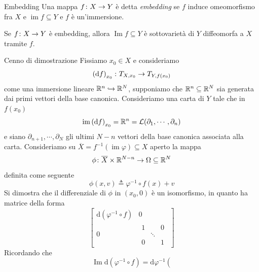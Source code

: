 \documentclass[a4paper]{article}
\begin{document}
\begin{snippetdefinition}{Embedding}
    Una mappa \(f \colon X \to Y\) è detta
    \emph{embedding} se \(f\) induce omeomorfismo fra \(X\)
    e \(\operatorname{im} f \subseteq Y\) e \(f\) è un'immersione.
\end{snippetdefinition}

\begin{snippetproposition}{}
    Se \(f \colon X \to Y\) è embedding, allora
    \(\operatorname{Im}f  \subseteq Y\) è sottovarietà
    di \(Y\) diffeomorfa a \(X\) tramite \(f\).
\end{snippetproposition}

\begin{snippetproof}{Cenno di dimostrazione}
    Fissiamo \(x_0 \in X\) e consideriamo
    \[
        \left(\text{d}f\right)_{x_0} \colon
        T_{X,{x_0}} \to T_{Y,f({x_0})}
    \]
    come una immersione lineare \(\mathbb{R}^n \hookrightarrow \mathbb{R}^N\), %
    supponiamo che \(\mathbb{R}^n \subseteq \mathbb{R}^N\) sia generata dai primi vettori della base canonica.
    Consideriamo una carta di \(Y\) tale che in \(f(x_0)\) \[
        \operatorname{im}\left(\text{d}f\right)_{x_0} = \mathbb{R}^n
        = \mathcal L(\partial_1, \cdots, \partial_n)
    \]
    e siano \(\partial_{n+1}, \cdots, \partial_N\) gli ultimi \(N-n\)
    vettori della base canonica associata alla carta. Consideriamo su
    \(\overline X = f^{-1}(\operatorname{im}\varphi) \subseteq X\)
    aperto la mappa \[
        \phi \colon \overline X \times \mathbb{R}^{N-n} \to \Omega \subseteq \mathbb{R}^N
    \]
    definita come seguente
    \[
        \phi(x, v) \triangleq \varphi^{-1} \circ f(x) + v
    \]
    Si dimostra che il differenziale di \(\phi\) in \((x_0, 0)\)
    è un isomorfismo, in quanto ha matrice della forma
    \[
        \left[
        \begin{array}{c|c}
        \mathrm{d}\!\left(\varphi^{-1}\circ f\right) & 0 \\
        \hline
        0 &
        \begin{array}{ccc}
        1 &        & 0 \\
        & \ddots &   \\
        0 &        & 1
        \end{array}
        \end{array}
        \right]
    \]
    Ricordando che
    \[
        \operatorname{Im}\text{d}\left(\varphi^{-1} \circ f\right)
        = \text{d} \varphi^{-1} \left(
\]
\end{snippetproof}
\end{document}

